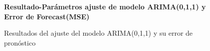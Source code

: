 %
%
\begin{figure}[H]
	\centering
	\textbf{Resultado-Parámetros ajuste de modelo ARIMA(0,1,1) y Error de Forecast(MSE)}\par\medskip
	\caption{Resultados del ajuste del modelo ARIMA(0,1,1) y su error de pronóstico}\label{fig24}
\end{figure}
